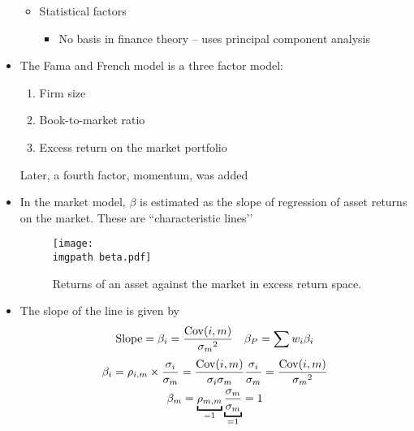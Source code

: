 \documentclass[../notes_compiled.tex]{subfiles}
\begin{document}
\begin{itemize}
\begin{itemize}
\item Statistical factors
\begin{itemize}
\item No basis in finance theory -- uses principal component analysis
\end{itemize}
\end{itemize}
\item The Fama and French model is a three factor model:
\begin{multicols}{3}
\begin{enumerate}
\item Firm size
\item Book-to-market ratio
\item Excess return on the market portfolio
\end{enumerate}
\end{multicols}
Later, a fourth factor, momentum, was added
\item In the market model, $\beta$ is estimated as the slope of regression of asset returns on the market. These are ``characteristic lines’’
\begin{figure}[h]
  \centering
  \texttt{[image: \\imgpath beta.pdf]}
  \caption{Returns of an asset against the market in excess return space.}
\end{figure}
\item[] The slope of the line is given by
\begin{align}
&& \text{Slope} &= \beta_{i} = \frac{\operatorname{Cov}(i,m)}{{\sigma_{m}}^{2}} & \beta_{P} &= \sum w_{i}\beta_{i}
\end{align}
\begin{gather}
\beta_{i} = \rho_{i,m}\times\frac{\sigma_{i}}{\sigma_{m}} = \frac{\Cov(i,m)}{\sigma_{i}\sigma_{m}}\frac{\sigma_{i}}{\sigma_{m}} = \frac{\Cov(i,m)}{{\sigma_{m}}^{2}} \\
\beta_{m} = \underbracket{\rho_{m,m}}_{=1}\underbracket{\frac{\sigma_{m}}{\sigma_{m}}}_{=1} = 1
\end{gather}

\end{itemize}
\end{document}
